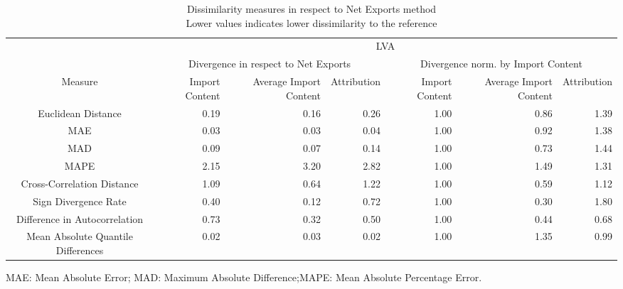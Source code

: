 \begin{table}[t]
\caption*{
{\large Dissimilarity measures in respect to Net Exports method} \\ 
{\small Lower values indicates lower dissimilarity to the reference}
} 
\fontsize{15.0pt}{18.0pt}\selectfont
\begin{tabular*}{\linewidth}{@{\extracolsep{\fill}}crrrrrr}
\toprule
 & \multicolumn{6}{c}{LVA} \\ 
\cmidrule(lr){2-7}
 & \multicolumn{3}{c}{Divergence in respect to Net Exports} & \multicolumn{3}{c}{Divergence norm. by Import Content} \\ 
\cmidrule(lr){2-4} \cmidrule(lr){5-7}
Measure & Import Content & Average Import Content & Attribution & Import Content & Average Import Content & Attribution \\ 
\midrule\addlinespace[2.5pt]
Euclidean Distance & 0.19 & 0.16 & 0.26 & 1.00 & 0.86 & 1.39 \\ 
MAE & 0.03 & 0.03 & 0.04 & 1.00 & 0.92 & 1.38 \\ 
MAD & 0.09 & 0.07 & 0.14 & 1.00 & 0.73 & 1.44 \\ 
MAPE & 2.15 & 3.20 & 2.82 & 1.00 & 1.49 & 1.31 \\ 
Cross-Correlation Distance & 1.09 & 0.64 & 1.22 & 1.00 & 0.59 & 1.12 \\ 
Sign Divergence Rate & 0.40 & 0.12 & 0.72 & 1.00 & 0.30 & 1.80 \\ 
Difference in Autocorrelation & 0.73 & 0.32 & 0.50 & 1.00 & 0.44 & 0.68 \\ 
Mean Absolute Quantile Differences & 0.02 & 0.03 & 0.02 & 1.00 & 1.35 & 0.99 \\ 
\bottomrule
\end{tabular*}
\begin{minipage}{\linewidth}
MAE: Mean Absolute Error; MAD: Maximum Absolute Difference;MAPE: Mean Absolute Percentage Error.\\
\end{minipage}
\end{table}

